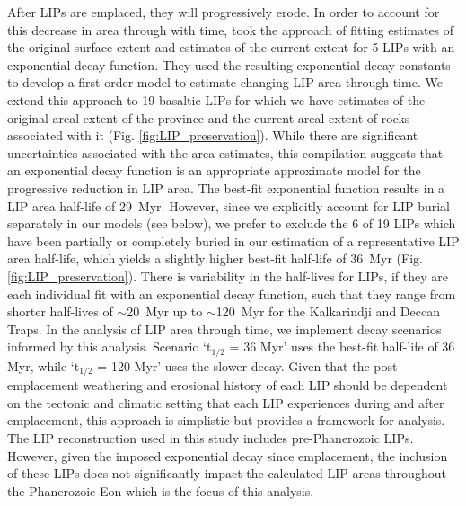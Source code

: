 \documentclass[11pt,letterpaper]{article}
\begin{document}
After LIPs are emplaced, they will progressively erode. In order to account for this decrease in area through with time, \citet{Godderis2017a} took the approach of fitting estimates of the original surface extent and estimates of the current extent for 5 LIPs with an exponential decay function. They used the resulting exponential decay constants to develop a first-order model to estimate changing LIP area through time. We extend this approach to 19 basaltic LIPs for which we have estimates of the original areal extent of the province and the current areal extent of rocks associated with it (Fig. \ref{fig:LIP_preservation}). While there are significant uncertainties associated with the area estimates, this compilation suggests that an exponential decay function is an appropriate approximate model for the progressive reduction in LIP area. The best-fit exponential function results in a LIP area half-life of 29~Myr. However, since we explicitly account for LIP burial separately in our models (see below), we prefer to exclude the 6 of 19 LIPs which have been partially or completely buried in our estimation of a representative LIP area half-life, which yields a slightly higher best-fit half-life of 36~Myr (Fig. \ref{fig:LIP_preservation}). There is variability in the half-lives for LIPs, if they are each individual fit with an exponential decay function, such that they range from shorter half-lives of $\sim$20~Myr up to $\sim$120~Myr for the Kalkarindji and Deccan Traps. In the analysis of LIP area through time, we implement decay scenarios informed by this analysis. Scenario `t$_{1/2}$ = 36 Myr' uses the best-fit half-life of 36 Myr, while `t$_{1/2}$ = 120 Myr' uses the slower decay. Given that the post-emplacement weathering and erosional history of each LIP should be dependent on the tectonic and climatic setting that each LIP experiences during and after emplacement, this approach is simplistic but provides a framework for analysis. The LIP reconstruction used in this study includes pre-Phanerozoic LIPs. However, given the imposed exponential decay since emplacement, the inclusion of these LIPs does not significantly impact the calculated LIP areas throughout the Phanerozoic Eon which is the focus of this analysis.
\end{document}
